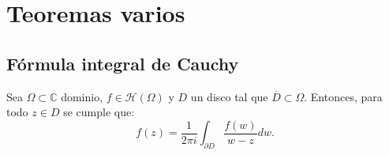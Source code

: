 \section{Teoremas varios}
\subsection{Fórmula integral de Cauchy}

\begin{teorema} 
    Sea $\Omega \subset \mathbb{C}$ dominio, $f \in  \mathcal{H}(\Omega)$ y $D$ un disco tal que $\overline{D} \subset \Omega$. Entonces, para todo $z \in D$ se cumple que:
    \[
    f(z) = \frac{1}{2 \pi i} \int_{\partial D} \frac{f(w)}{w - z} d w.
    \]    
\end{teorema}

